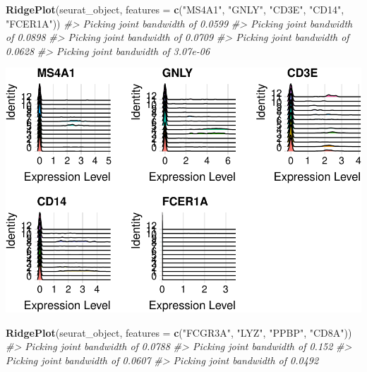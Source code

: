 \documentclass[
]{book}
\newenvironment{Shaded}{\begin{snugshade}}{\end{snugshade}}
\newcommand{\AttributeTok}[1]{\textcolor[rgb]{0.13,0.29,0.53}{#1}}
\newcommand{\CommentTok}[1]{\textcolor[rgb]{0.56,0.35,0.01}{\textit{#1}}}
\newcommand{\FunctionTok}[1]{\textcolor[rgb]{0.13,0.29,0.53}{\textbf{#1}}}
\newcommand{\NormalTok}[1]{#1}
\newcommand{\StringTok}[1]{\textcolor[rgb]{0.31,0.60,0.02}{#1}}
\begin{document}
\begin{Shaded}
\begin{Highlighting}[]
\FunctionTok{RidgePlot}\NormalTok{(seurat\_object, }\AttributeTok{features =} \FunctionTok{c}\NormalTok{(}\StringTok{"MS4A1"}\NormalTok{, }\StringTok{"GNLY"}\NormalTok{, }\StringTok{"CD3E"}\NormalTok{, }\StringTok{"CD14"}\NormalTok{, }\StringTok{"FCER1A"}\NormalTok{))}
\CommentTok{\#\textgreater{} Picking joint bandwidth of 0.0599}
\CommentTok{\#\textgreater{} Picking joint bandwidth of 0.0898}
\CommentTok{\#\textgreater{} Picking joint bandwidth of 0.0709}
\CommentTok{\#\textgreater{} Picking joint bandwidth of 0.0628}
\CommentTok{\#\textgreater{} Picking joint bandwidth of 3.07e{-}06}
\end{Highlighting}
\end{Shaded}

\includegraphics{scRNAseqInR_ABACBS_2024_Doco_files/figure-latex/ridgeplots-1.pdf}

\begin{Shaded}
\begin{Highlighting}[]
\FunctionTok{RidgePlot}\NormalTok{(seurat\_object, }\AttributeTok{features =} \FunctionTok{c}\NormalTok{(}\StringTok{"FCGR3A"}\NormalTok{, }\StringTok{"LYZ"}\NormalTok{, }\StringTok{"PPBP"}\NormalTok{, }\StringTok{"CD8A"}\NormalTok{))}
\CommentTok{\#\textgreater{} Picking joint bandwidth of 0.0788}
\CommentTok{\#\textgreater{} Picking joint bandwidth of 0.152}
\CommentTok{\#\textgreater{} Picking joint bandwidth of 0.0607}
\CommentTok{\#\textgreater{} Picking joint bandwidth of 0.0492}
\end{Highlighting}
\end{Shaded}
\end{document}
